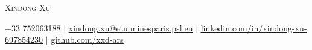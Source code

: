 \documentclass[letterpaper,10pt]{article}
\begin{document}

\begin{center}
    {\Huge \scshape Xindong Xu} \\ \vspace{1pt}

    
    \small +33 752063188 $|$ 
    \href{mailto:x@x.com}{\underline{xindong.xu@etu.minesparis.psl.eu}} $|$ 
    \href{https://linkedin.com/in/...}{\underline{linkedin.com/in/xindong-xu-697854230}} $|$
    \href{https://github.com/...}{\underline{github.com/xxd-ars}}
\end{center}


\end{document}
